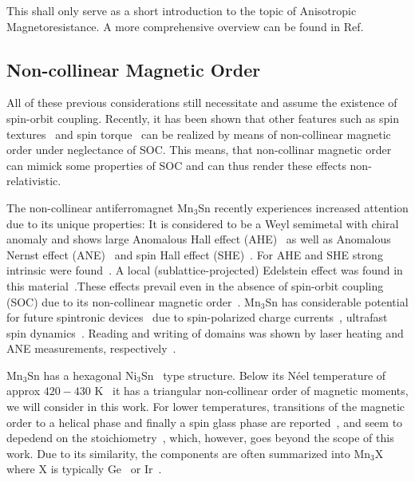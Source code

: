 \documentclass[prb,showpacs,amsmath,amssymb,superscriptaddress,twocolumn,floatfix]{revtex4-1}
\begin{document}
This shall only serve as a short introduction to the topic of Anisotropic Magnetoresistance. A more comprehensive overview can be found in Ref.~\cite{Ritzinger:2023}

\subsection{Non-collinear Magnetic Order}

All of these previous considerations still necessitate and assume the existence of spin-orbit coupling. Recently, it has been shown that other features such as spin textures~\cite{Bonbien:2022} and spin torque~\cite{Gonzalez-Hernandez:2024} can be realized by means of non-collinear magnetic order under neglectance of SOC. This means, that non-collinar magnetic order can mimick some properties of SOC and can thus render these effects non-relativistic.

The non-collinear antiferromagnet Mn$_3$Sn recently experiences increased attention due to its unique properties: It is considered to be a Weyl semimetal with chiral anomaly\cite{Park:2018, Sharma:2023, Manna:2018, Wu:2023, Chen:2021, Nakatsuji:2015, Reichlova:2019} and shows large Anomalous Hall effect (AHE)~\cite{Manna:2018, Chen:2021, Zelezny:2017, Nakatsuji:2015, Zhou:2020} as well as Anomalous Nernst effect (ANE)~\cite{Manna:2018, Chen:2021, Zhou:2020, Ikhlas:2017} and spin Hall effect (SHE)~\cite{Zhou:2020, Zhang:2017}. For AHE and SHE strong intrinsic were found~\cite{Zhang:2017}. A local (sublattice-projected) Edelstein effect was found in this material~\cite{Gonzalez-Hernandez:2024}.These effects prevail even in the absence of spin-orbit coupling (SOC) due to its non-collinear magnetic order~\cite{Manna:2018, Gonzalez-Hernandez:2024}. Mn$_3$Sn has considerable potential for future spintronic devices~\cite{Manna:2018, Chen:2021, Nakatsuji:2015} due to spin-polarized charge currents~\cite{Zelezny:2017}, ultrafast spin dynamics~\cite{Chen:2021, Nakatsuji:2015}. Reading and writing of domains was shown by laser heating and ANE measurements, respectively~\cite{Reichlova:2019}.

Mn$_3$Sn has a hexagonal Ni$_3$Sn~\cite{Nakatsuji:2015} type structure. Below its N\'eel temperature of approx $420-430$ K~\cite{Sharma:2023, Cable:1993, Nakatsuji:2015, Zhou:2020, Chen:2021, Ikhlas:2017} it has a triangular non-collinear order of magnetic moments, we will consider in this work. For lower temperatures, transitions of the magnetic order to a helical phase and finally a spin glass phase are reported~\cite{Park:2018, Sharma:2023,Chen:2021}, and seem to depedend on the stoichiometry~\cite{Park:2018}, which, however, goes beyond the scope of this work. Due to its similarity, the components are often summarized into Mn$_3$X~\cite{Chen:2021} where X is typically Ge~\cite{Sharma:2023, Manna:2018, Wu:2023, Chen:2021, Cable:1993} or Ir~\cite{Gonzalez-Hernandez:2024,Zelezny:2017}.
\end{document}
